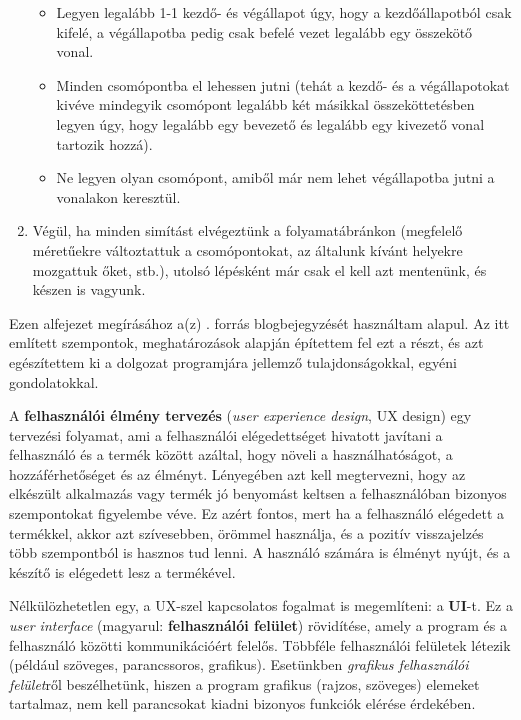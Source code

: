 \begin{enumerate}
\begin{itemize}
\item Legyen legalább 1-1 kezdő- és végállapot úgy, hogy a kezdőállapotból csak kifelé, a végállapotba pedig csak befelé vezet legalább egy összekötő vonal.
\item Minden csomópontba el lehessen jutni (tehát a kezdő- és a végállapotokat kivéve mindegyik csomópont legalább két másikkal összeköttetésben legyen úgy, hogy legalább egy bevezető és legalább egy kivezető vonal tartozik hozzá).
\item Ne legyen olyan csomópont, amiből már nem lehet végállapotba jutni a vonalakon keresztül.
\end{itemize}

\item Végül, ha minden simítást elvégeztünk a folyamatábránkon (megfelelő méretűekre változtattuk a csomópontokat, az általunk kívánt helyekre mozgattuk őket, stb.), utolsó lépésként már csak el kell azt mentenünk, és készen is vagyunk.
\end{enumerate}


Ezen alfejezet megírásához a(z) \cite{uxblog}. forrás blogbejegyzését használtam alapul. Az itt említett szempontok, meghatározások alapján építettem fel ezt a részt, és azt egészítettem ki a dolgozat programjára jellemző tulajdonságokkal, egyéni gondolatokkal.


A \textbf{felhasználói élmény tervezés} (\textit{user experience design}, UX design) egy tervezési folyamat, ami a felhasználói elégedettséget hivatott javítani a felhasználó és a termék között azáltal, hogy növeli a használhatóságot, a hozzáférhetőséget és az élményt. Lényegében azt kell megtervezni, hogy az elkészült alkalmazás vagy termék jó benyomást keltsen a felhasználóban bizonyos szempontokat figyelembe véve. Ez azért fontos, mert ha a felhasználó elégedett a termékkel, akkor azt szívesebben, örömmel használja, és a pozitív visszajelzés több szempontból is hasznos tud lenni. A használó számára is élményt nyújt, és a készítő is elégedett lesz a termékével.

Nélkülözhetetlen egy, a UX-szel kapcsolatos fogalmat is megemlíteni: a \textbf{UI}-t. Ez a \textit{user interface} (magyarul: \textbf{felhasználói felület}) rövidítése, amely a program és a felhasználó közötti kommunikációért felelős. Többféle felhasználói felületek létezik (például szöveges, parancssoros, grafikus). Esetünkben \textit{grafikus felhasználói felület}ről beszélhetünk, hiszen a program grafikus (rajzos, szöveges) elemeket tartalmaz, nem kell parancsokat kiadni bizonyos funkciók elérése érdekében.

